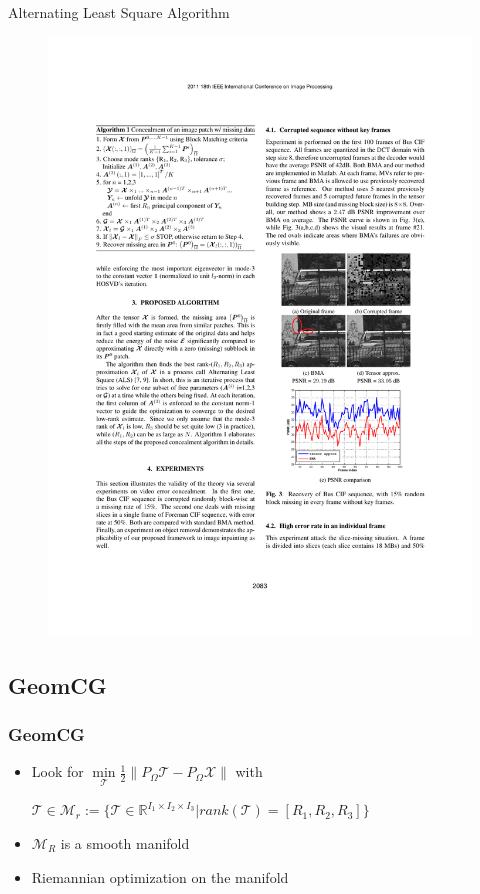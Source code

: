 \documentclass{beamer}
\begin{document}
\begin{frame}[fragile] %
\begin{block}{Alternating Least Square Algorithm}
\begin{figure}
\includegraphics[width=0.7\linewidth]{AlgoALS}
\end{figure}
\end{block}
\end{frame}

\subsection{GeomCG}

\begin{frame}
\frametitle{GeomCG}
\begin{itemize}
\item Look for $\min\limits_{\mathcal{T}} \frac{1}{2}\| P_{\Omega} \mathcal{T}-P_{\Omega} \mathcal{X} \|$ with \begin{center}$\mathcal{T}\in \mathcal{M}_r:=\{ \mathcal{T} \in \mathbb{R}^{I_1\times I_2\times I_3} | rank(\mathcal{T})=[R_1, R_2, R_3] \}$ \end{center}
\item $\mathcal{M}_R$ is a smooth manifold
\item Riemannian optimization on the manifold
\end{itemize}
\end{frame}
\end{document}
